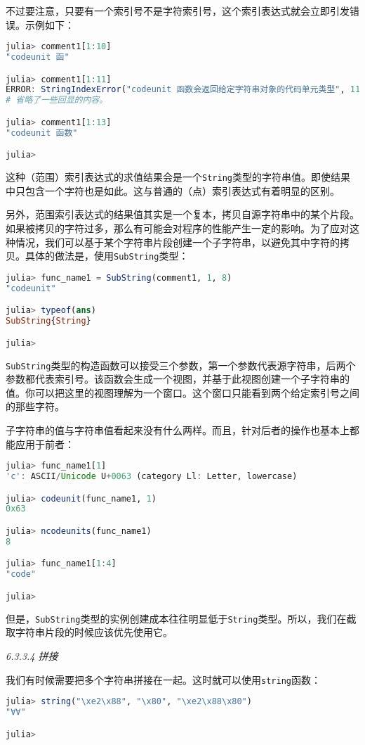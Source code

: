 不过要注意，只要有一个索引号不是字符索引号，这个索引表达式就会立即引发错误。示例如下：
\begin{lstlisting}[language=julia]
julia> comment1[1:10]
"codeunit 函"

julia> comment1[1:11]
ERROR: StringIndexError("codeunit 函数会返回给定字符串对象的代码单元类型", 11)
# 省略了一些回显的内容。

julia> comment1[1:13]
"codeunit 函数"

julia> 
\end{lstlisting}

这种（范围）索引表达式的求值结果会是一个\verb|String|类型的字符串值。即使结果中只包含一个字符也是如此。这与普通的（点）索引表达式有着明显的区别。

另外，范围索引表达式的结果值其实是一个复本，拷贝自源字符串中的某个片段。如果被拷贝的字符过多，那么有可能会对程序的性能产生一定的影响。为了应对这种情况，我们可以基于某个字符串片段创建一个子字符串，以避免其中字符的拷贝。具体的做法是，使用\verb|SubString|类型：
\begin{lstlisting}[language=julia]
julia> func_name1 = SubString(comment1, 1, 8)
"codeunit"

julia> typeof(ans)
SubString{String}

julia> 
\end{lstlisting}

\verb|SubString|类型的构造函数可以接受三个参数，第一个参数代表源字符串，后两个参数都代表索引号。该函数会生成一个视图，并基于此视图创建一个子字符串的值。你可以把这里的视图理解为一个窗口。这个窗口只能看到两个给定索引号之间的那些字符。

子字符串的值与字符串值看起来没有什么两样。而且，针对后者的操作也基本上都能应用于前者：
\begin{lstlisting}[language=julia]
julia> func_name1[1]
'c': ASCII/Unicode U+0063 (category Ll: Letter, lowercase)

julia> codeunit(func_name1, 1)
0x63

julia> ncodeunits(func_name1)
8

julia> func_name1[1:4]
"code"

julia> 
\end{lstlisting}

但是，\verb|SubString|类型的实例创建成本往往明显低于\verb|String|类型。所以，我们在截取字符串片段的时候应该优先使用它。

\textsl{6.3.3.4 拼接}

我们有时候需要把多个字符串拼接在一起。这时就可以使用\verb|string|函数：
\begin{lstlisting}[language=julia]
julia> string("\xe2\x88", "\x80", "\xe2\x88\x80")
"∀∀"

julia> 
\end{lstlisting}

